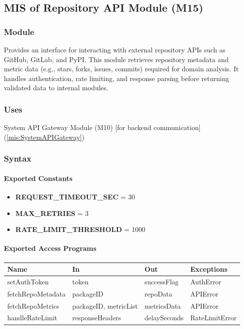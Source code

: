 \documentclass[12pt, titlepage]{article}
\begin{document}
\subsection{MIS of Repository API Module (M15)}
\label{mis:RepositoryAPIModule}

\subsubsection{Module}
Provides an interface for interacting with external repository APIs such as GitHub, GitLab, and PyPI.
This module retrieves repository metadata and metric data (e.g., stars, forks, issues, commits) required for domain analysis.
It handles authentication, rate limiting, and response parsing before returning validated data to internal modules.

\subsubsection{Uses}
System API Gateway Module (M10) [for backend communication] (\ref{mis:SystemAPIGateway})\\

\subsubsection{Syntax}

\paragraph{Exported Constants}
\begin{itemize}
  \item \textbf{REQUEST\_TIMEOUT\_SEC} = 30
  \item \textbf{MAX\_RETRIES} = 3
  \item \textbf{RATE\_LIMIT\_THRESHOLD} = 1000
\end{itemize}

\paragraph{Exported Access Programs}
\begin{center}
\renewcommand{\arraystretch}{1.2}
\begin{tabularx}{\textwidth}{l X X l}
\toprule
\textbf{Name} & \textbf{In} & \textbf{Out} & \textbf{Exceptions}\\
\midrule
setAuthToken & token & successFlag & AuthError \\
fetchRepoMetadata & packageID & repoData & APIError \\
fetchRepoMetrics & packageID, metricList & metricsData & APIError \\
handleRateLimit & responseHeaders & delaySeconds & RateLimitError \\
\bottomrule
\end{tabularx}
\end{center}
\end{document}
